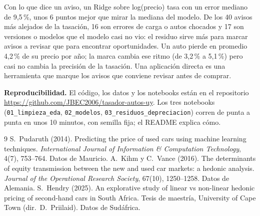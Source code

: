 \documentclass[11pt,a4paper]{article}
\begin{document}
Con lo que dice un aviso, un Ridge sobre log(precio) tasa con un error mediano de 9,5\,\%, unos 6 puntos
mejor que mirar la mediana del modelo. De los 40 avisos más alejados de la tasación, 16 son errores
de carga o autos chocados y 17 son versiones o modelos que el modelo casi no vio: el residuo sirve más
para marcar avisos a revisar que para encontrar oportunidades. Un auto pierde en promedio 4,2\,\% de su precio por año; la marca cambia ese ritmo (de 3,2\,\% a
5,1\,\%) pero casi no cambia la precisión de la tasación. Una aplicación directa es una herramienta que
marque los avisos que conviene revisar antes de comprar.

\medskip
\noindent\textbf{Reproducibilidad.} El código, los datos y los notebooks están en el repositorio
\url{https://github.com/JBEC2006/tasador-autos-uy}. Los tres
notebooks (\texttt{01\_limpieza\_eda}, \texttt{02\_modelos}, \texttt{03\_residuos\_depreciacion})
corren de punta a punta en unos 10 minutos, con semilla fija; el README explica cómo.

\begin{thebibliography}{9}
\small
{} S.~Pudaruth (2014). Predicting the price of used cars using machine learning
techniques. \emph{International Journal of Information \& Computation Technology}, 4(7), 753--764.
Datos de Mauricio.
 A.~Kihm y C.~Vance (2016). The determinants of equity transmission between the new and
used car markets: a hedonic analysis. \emph{Journal of the Operational Research Society}, 67(10),
1250--1258. Datos de Alemania.
 S.~Hendry (2025). An explorative study of linear vs non-linear hedonic pricing of
second-hand cars in South Africa. Tesis de maestría, University of Cape Town (dir.\ D.~Priilaid).
Datos de Sudáfrica.
\end{thebibliography}
\end{document}
